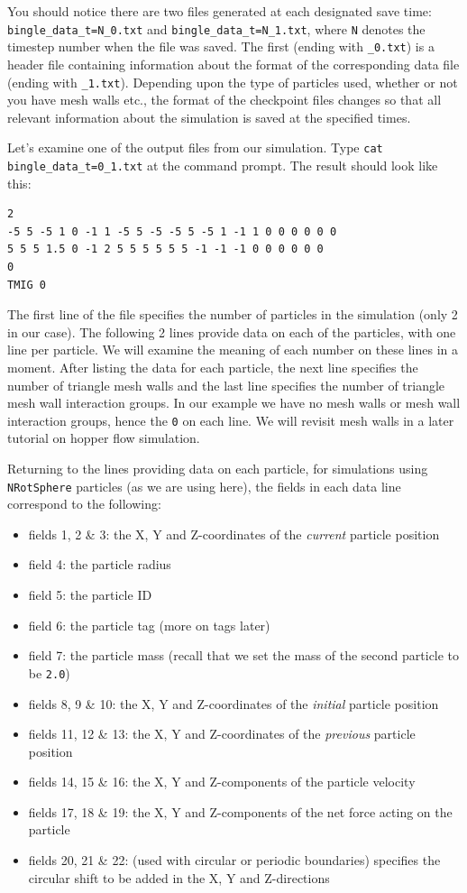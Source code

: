 \noindent
You should notice there are two files generated at each designated save time: \texttt{bin\+gle\_\+da\+ta\_\+t=N\_0.txt} and \texttt{bingle\_data\_t=N\_1.txt}, where \texttt{N} denotes the timestep number when the file was saved. The first (ending with \texttt{\_0.txt}) is a header file containing information about the format of the corresponding data file (ending with \texttt{\_1.txt}). Depending upon the type of particles used, whether or not you have mesh walls etc., the format of the checkpoint files changes so that all relevant information about the simulation is saved at the specified times. 

Let's examine one of the output files from our simulation. Type \texttt{cat bin\+gle\_\+da\+ta\_\+t=0\_1.txt} at the command prompt. The result should look like this:

\begin{verbatim}
2
-5 5 -5 1 0 -1 1 -5 5 -5 -5 5 -5 1 -1 1 0 0 0 0 0 0
5 5 5 1.5 0 -1 2 5 5 5 5 5 5 -1 -1 -1 0 0 0 0 0 0
0
TMIG 0
\end{verbatim}

\noindent
The first line of the file specifies the number of particles in the simulation (only 2 in our case). The following 2 lines provide data on each of the particles, with one line per particle. We will examine the meaning of each number on these lines in a moment. After listing the data for each particle, the next line specifies the number of triangle mesh walls and the last line specifies the number of triangle mesh wall interaction groups. In our example we have no mesh walls or mesh wall interaction groups, hence the \texttt{0} on each line. We will revisit mesh walls in a later tutorial on hopper flow simulation.

Returning to the lines providing data on each particle, for simulations using \texttt{NRot\+Sphere} particles (as we are using here), the fields in each data line correspond to the following:
\begin{itemize}
\item fields 1, 2 \& 3: the X, Y and Z-coordinates of the \emph{current} particle position
\item field 4: the particle radius
\item field 5: the particle ID
\item field 6: the particle tag (more on tags later)
\item field 7: the particle mass (recall that we set the mass of the second particle to be \texttt{2.0})
\item fields 8, 9 \& 10: the X, Y and Z-coordinates of the \emph{initial} particle position
\item fields 11, 12 \& 13: the X, Y and Z-coordinates of the \emph{previous} particle position
\item fields 14, 15 \& 16: the X, Y and Z-components of the particle velocity
\item fields 17, 18 \& 19: the X, Y and Z-components of the net force acting on the particle
\item fields 20, 21 \& 22: (used with circular or periodic boundaries) specifies the circular shift to be added in the X, Y and Z-directions 
\end{itemize}


